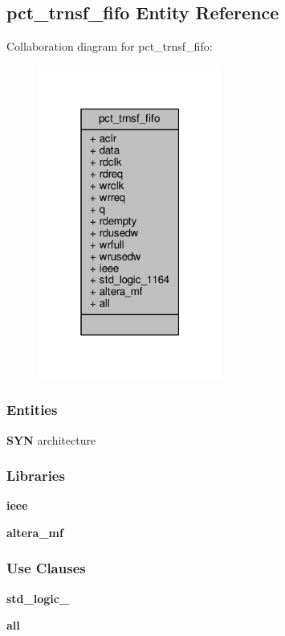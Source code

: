\subsection{pct\+\_\+trnsf\+\_\+fifo Entity Reference}
\label{classpct__trnsf__fifo}


Collaboration diagram for pct\+\_\+trnsf\+\_\+fifo\+:\nopagebreak
\begin{figure}[H]
\begin{center}
\leavevmode
\includegraphics[width=171pt]{df/db5/classpct__trnsf__fifo__coll__graph}
\end{center}
\end{figure}
\subsubsection*{Entities}
\begin{DoxyCompactItemize}
\item 
{\bf S\+YN} architecture
\end{DoxyCompactItemize}
\subsubsection*{Libraries}
 \begin{DoxyCompactItemize}
\item 
{\bf ieee} 
\item 
{\bf altera\+\_\+mf} 
\end{DoxyCompactItemize}
\subsubsection*{Use Clauses}
 \begin{DoxyCompactItemize}
\item 
{\bf std\+\_\+logic\+\_}   
\item 
{\bf  all }   
\end{DoxyCompactItemize}
